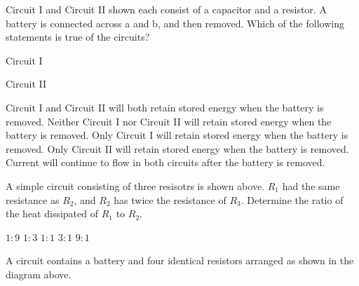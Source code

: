 \documentclass{../../../oss-ap12ibhl}
\begin{document}
\begin{questions}
  \question Circuit I and Circuit II shown each consist of a capacitor and a
  resistor. A battery is connected across a and b, and then removed. Which of
  the following statements is true of the circuits?
  \begin{center}
    Circuit I\\
    
    Circuit II\\
  \end{center}
  \begin{choices}
    \choice Circuit I and Circuit II will both retain stored energy when the
    battery is removed.
    \choice Neither Circuit I nor Circuit II will retain stored energy when
    the battery is removed.
    \choice Only Circuit I will retain stored energy when the battery is
    removed.
    \choice Only Circuit II will retain stored energy when the battery is
    removed.
    \choice Current will continue to flow in both circuits after the battery
    is removed.
  \end{choices}

  \question A simple circuit consisting of three resisotrs is shown above.
  $R_1$ had the same resistance as $R_2$, and $R_2$ has twice the resistance
  of $R_3$. Determine the ratio of the heat dissipated of $R_1$ to $R_2$.
  \begin{choices}
    \choice $1:9$
    \choice $1:3$
    \choice $1:1$
    \choice $3:1$
    \correctchoice $9:1$
  \end{choices}

  \question A circuit contains a battery and four identical resistors arranged
  as shown in the diagram above.
  \begin{parts}

\end{parts}
\end{questions}
\end{document}
